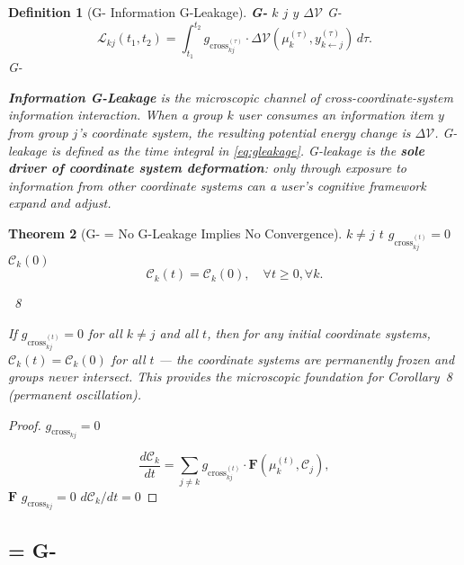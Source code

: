 \documentclass[11pt,a4paper]{article}
\newtheorem{theorem}{Theorem}[section]
\newtheorem{definition}[theorem]{Definition}
\theoremstyle{remark}
\newcommand{\GCoupling}{g_{\text{cross}}}
\newcommand{\CoordSys}{\mathcal{C}}
\newcommand{\InfoPE}{\mathcal{V}}
\begin{document}
\begin{definition}[G- Information G-Leakage]
\textbf{G-}
 $k$  $j$  $y$ 
 $\Delta \InfoPE$
G-
\begin{equation}\label{eq:gleakage}
\mathcal{L}_{kj}(t_1, t_2) = \int_{t_1}^{t_2} \GCoupling_{kj}^{(\tau)} \cdot
\Delta \InfoPE(\mu_k^{(\tau)}, y_{k \leftarrow j}^{(\tau)}) \, d\tau.
\end{equation}
G-\textbf{}



\textbf{Information G-Leakage} is the microscopic channel of cross-coordinate-system
information interaction. When a group $k$ user consumes an information item $y$ from
group $j$'s coordinate system, the resulting potential energy change is $\Delta \InfoPE$.
G-leakage is defined as the time integral in \eqref{eq:gleakage}. G-leakage is the
\textbf{sole driver of coordinate system deformation}: only through exposure to
information from other coordinate systems can a user's cognitive framework expand and adjust.
\end{definition}

\begin{theorem}[G- =  No G-Leakage Implies No Convergence]
\label{thm:nogleak}
 $k \neq j$  $t$ $\GCoupling_{kj}^{(t)} = 0$
 $\CoordSys_k(0)$
\begin{equation}
\CoordSys_k(t) = \CoordSys_k(0), \quad \forall t \geq 0, \forall k.
\end{equation}

~8

If $\GCoupling_{kj}^{(t)} = 0$ for all $k \neq j$ and all $t$, then for any initial
coordinate systems, $\CoordSys_k(t) = \CoordSys_k(0)$ for all $t$ --- the coordinate
systems are permanently frozen and groups never intersect. This provides the microscopic
foundation for Corollary~8 (permanent oscillation).
\end{theorem}

\begin{proof}

$\GCoupling_{kj}=0$


\[
\frac{d\CoordSys_k}{dt} = \sum_{j \neq k} \GCoupling_{kj}^{(t)} \cdot
\mathbf{F}(\mu_k^{(t)}, \CoordSys_j),
\]
 $\mathbf{F}$ 
 $\GCoupling_{kj} = 0$ $d\CoordSys_k/dt = 0$
\end{proof}

\subsection{ = G-}
\end{document}
